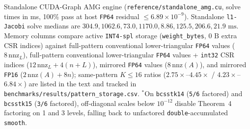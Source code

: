 \documentclass[10pt]{article}
\begin{document}
\begin{table}[t]
\caption{Standalone CUDA-Graph AMG engine (\texttt{reference/standalone\_amg.cu}, solve times in ms, 100\% pass at host \texttt{FP64} residual $\le 6.89\times 10^{-9}$). Standalone \texttt{l1-Jacobi} solve medians are $304.9, 1062.6, 73.0, 1170.0, 8.86, 125.5, 206.6, 21.9\text{ ms}$. Memory columns compare active \texttt{INT4-spl} storage (\texttt{weight\_bytes}, $0\text{ B}$ extra CSR indices) against full-pattern conventional lower-triangular \texttt{FP64} values ($8\,\mathrm{nnz}_L$), full-pattern conventional lower-triangular \texttt{FP64} values + \texttt{int32} CSR indices ($12\,\mathrm{nnz}_L + 4(n+L)$), mirrored \texttt{FP64} values ($8\,\mathrm{nnz}(A)$), and mirrored \texttt{FP16} ($2\,\mathrm{nnz}(A) + 8n$); same-pattern $K \le 16$ ratios ($2.75\times$--$4.45\times$ / $4.23\times$--$6.84\times$) are listed in the text and tracked in \texttt{benchmarks/results/pattern\_storage.csv}. $^*$On \texttt{bcsstk14} (\texttt{5/6} factored) and \texttt{bcsstk15} (\texttt{3/6} factored), off-diagonal scales below $10^{-12}$ disable Theorem~4 factoring on 1 and 3 levels, falling back to unfactored \texttt{double}-accumulated \texttt{smooth}.}
\label{tab:standalone}
\end{table}
\end{document}

